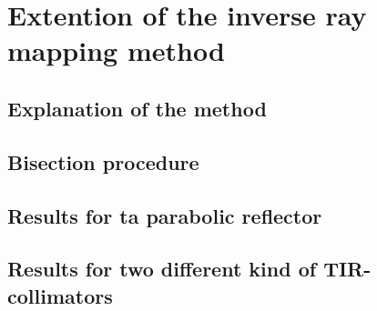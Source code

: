\chapter{Extention of the inverse ray mapping method}

 
\section{Explanation of the method}

\section*{Bisection procedure}

\section{Results for ta parabolic reflector}

\section{Results for two different kind of TIR-collimators}